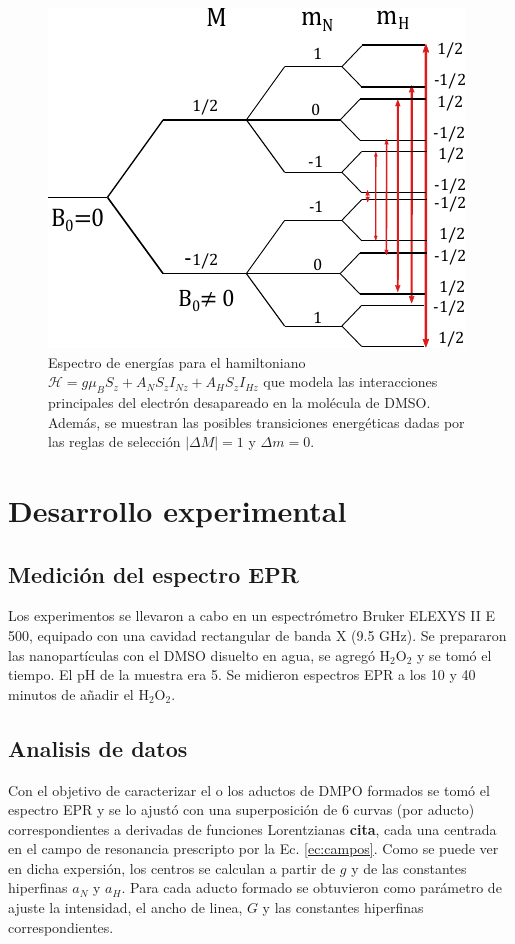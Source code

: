 \documentclass[aps,prl,reprint,superscriptaddress,showkeys]{revtex4-2}
\begin{document}
\begin{figure}[ht]
    \centering
    \includegraphics[width=0.80\linewidth]{spliteo.pdf}
    \caption{\centering Espectro de energías para el hamiltoniano $ \mathcal{H} = g \mu_B S_z + A_N S_z I_{Nz} + A_H S_z I_{Hz}$ que modela las interacciones principales del electrón desapareado en la molécula de DMSO. Además, se muestran las posibles transiciones energéticas dadas por las reglas de selección $|\Delta M| = 1$ y $\Delta m = 0$.}
    \label{fig:spliteo}
\end{figure}


\section{Desarrollo experimental}
\subsection{Medición del espectro EPR}
Los experimentos se llevaron a cabo en un espectrómetro Bruker ELEXYS II E 500, equipado con una cavidad rectangular de banda X (9.5 GHz). Se prepararon las nanopartículas con el DMSO disuelto en agua, se agregó H$_2$O$_2$ y se tomó el tiempo. El pH de la muestra era 5. Se midieron  espectros EPR a los 10 y 40 minutos de añadir el H$_2$O$_2$.

\subsection{Analisis de datos}
Con el objetivo de caracterizar el o los aductos de DMPO formados se tomó el espectro EPR y se lo ajustó con una superposición de 6 curvas (por aducto) correspondientes a derivadas de funciones Lorentzianas \textbf{cita}, cada una centrada en el campo de resonancia prescripto por la Ec. \ref*{ec:campos}. Como se puede ver en dicha expersión, los centros se calculan a partir de $g$ y de las constantes hiperfinas $a_N$ y $a_H$. Para cada aducto formado se obtuvieron como parámetro de ajuste la intensidad, el ancho de linea, $G$ y las constantes hiperfinas correspondientes. 
\end{document}
